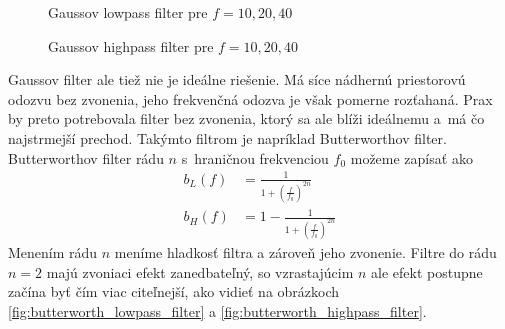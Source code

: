 \begin{figure}[htp]
    \def\path{obrazky/informatika/digitalne_filtre}
    \centering
    \caption{Gaussov lowpass filter pre $f=10,20,40$}
    \label{fig:gauss_lowpass_filter}
\end{figure}

\begin{figure}[htp]
    \def\path{obrazky/informatika/digitalne_filtre}
    \centering
    \caption{Gaussov highpass filter pre $f=10,20,40$}
    \label{fig:gauss_highpass_filter}
\end{figure}

Gaussov filter ale tiež nie je ideálne riešenie. Má síce nádhernú
priestorovú odozvu bez zvonenia, jeho frekvenčná odozva je však
pomerne rozťahaná. Prax by preto potrebovala filter bez
zvonenia, ktorý sa ale blíži ideálnemu a~má čo najstrmejší prechod.
Takýmto filtrom je napríklad Butterworthov filter.
Butterworthov filter rádu $n$ s~hraničnou frekvenciou $f_0$
možeme zapísať ako
\begin{align*}
b_L(f) &=  \frac{1}{1 + (\frac{f}{f_0})^{2n}} \\
b_H(f) &= 1- \frac{1}{1 + (\frac{f}{f_0})^{2n}}
\end{align*}
Menením rádu $n$ meníme hladkosť filtra a zároveň jeho zvonenie.
Filtre do rádu $n=2$ majú zvoniaci efekt zanedbateľný, so vzrastajúcim
$n$ ale efekt postupne začína byť čím viac citeľnejší, ako vidieť na
obrázkoch \ref{fig:butterworth_lowpass_filter} a
\ref{fig:butterworth_highpass_filter}.


